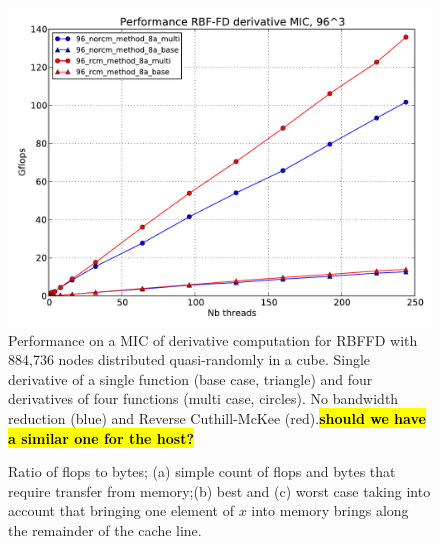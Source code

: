 \documentclass[10pt,conference,compsocconf]{IEEEtran}
\newcommand{\todo}[1]{{\color{red}\textbf{\hl{#1}}\xspace}}
\begin{document}
\begin{figure}
  \centering
  \includegraphics[width=.45\textwidth]{figures/plot_for_natasha_ncar_end_of_year.pdf}

  \caption{Performance on a MIC of derivative computation for RBFFD
    with 884,736 nodes distributed quasi-randomly in a cube. Single
    derivative of a single function (base case, triangle) and four
    derivatives of four functions (multi case, circles). No bandwidth
    reduction (blue) and Reverse Cuthill-McKee (red).\todo{should we have a similar one for the host?}}
\end{figure}

\begin{figure}
\centering
{}%
\caption{Ratio of flops to bytes; (a) simple count of flops and bytes that require transfer from memory;(b) best and (c) worst
case taking into account that bringing one element of $x$ into memory brings along the remainder of the cache line.}
\label{fig:ratio_bytes_flops}
\end{figure}
\end{document}
